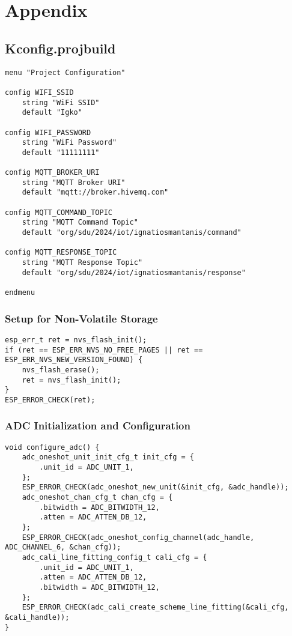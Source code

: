 \documentclass[
  article,
  10pt,
  a4paper,
  oneside,
  openany,
  twocolumn
]{memoir}
\begin{document}
\newpage
\appendix
\onecolumn

\chapter{Appendix}
\section*{Kconfig.projbuild}

\begin{verbatim}
menu "Project Configuration"

config WIFI_SSID
    string "WiFi SSID"
    default "Igko"

config WIFI_PASSWORD
    string "WiFi Password"
    default "11111111"

config MQTT_BROKER_URI
    string "MQTT Broker URI"
    default "mqtt://broker.hivemq.com"

config MQTT_COMMAND_TOPIC
    string "MQTT Command Topic"
    default "org/sdu/2024/iot/ignatiosmantanis/command"

config MQTT_RESPONSE_TOPIC
    string "MQTT Response Topic"
    default "org/sdu/2024/iot/ignatiosmantanis/response"

endmenu
\end{verbatim}

\subsection*{Setup for Non-Volatile Storage}
\begin{verbatim}
esp_err_t ret = nvs_flash_init();
if (ret == ESP_ERR_NVS_NO_FREE_PAGES || ret == ESP_ERR_NVS_NEW_VERSION_FOUND) {
    nvs_flash_erase();
    ret = nvs_flash_init();
}
ESP_ERROR_CHECK(ret);
\end{verbatim}

\subsection*{ADC Initialization and Configuration}
\begin{verbatim}
void configure_adc() {
    adc_oneshot_unit_init_cfg_t init_cfg = {
        .unit_id = ADC_UNIT_1,
    };
    ESP_ERROR_CHECK(adc_oneshot_new_unit(&init_cfg, &adc_handle));
    adc_oneshot_chan_cfg_t chan_cfg = {
        .bitwidth = ADC_BITWIDTH_12,
        .atten = ADC_ATTEN_DB_12,
    };
    ESP_ERROR_CHECK(adc_oneshot_config_channel(adc_handle, ADC_CHANNEL_6, &chan_cfg));
    adc_cali_line_fitting_config_t cali_cfg = {
        .unit_id = ADC_UNIT_1,
        .atten = ADC_ATTEN_DB_12,
        .bitwidth = ADC_BITWIDTH_12,
    };
    ESP_ERROR_CHECK(adc_cali_create_scheme_line_fitting(&cali_cfg, &cali_handle));
}
\end{verbatim}
\end{document}
